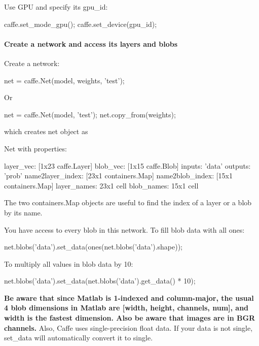 Use G\+PU and specify its gpu\+\_\+id\+: \begin{DoxyVerb}caffe.set_mode_gpu();
caffe.set_device(gpu_id);
\end{DoxyVerb}


\paragraph*{Create a network and access its layers and blobs}

Create a network\+: \begin{DoxyVerb}net = caffe.Net(model, weights, 'test'); %
\end{DoxyVerb}


Or \begin{DoxyVerb}net = caffe.Net(model, 'test'); %
net.copy_from(weights); %
\end{DoxyVerb}


which creates {\ttfamily net} object as \begin{DoxyVerb}  Net with properties:

           layer_vec: [1x23 caffe.Layer]
            blob_vec: [1x15 caffe.Blob]
              inputs: {'data'}
             outputs: {'prob'}
    name2layer_index: [23x1 containers.Map]
     name2blob_index: [15x1 containers.Map]
         layer_names: {23x1 cell}
          blob_names: {15x1 cell}
\end{DoxyVerb}


The two {\ttfamily containers.\+Map} objects are useful to find the index of a layer or a blob by its name.

You have access to every blob in this network. To fill blob \textquotesingle{}data\textquotesingle{} with all ones\+: \begin{DoxyVerb}net.blobs('data').set_data(ones(net.blobs('data').shape));
\end{DoxyVerb}


To multiply all values in blob \textquotesingle{}data\textquotesingle{} by 10\+: \begin{DoxyVerb}net.blobs('data').set_data(net.blobs('data').get_data() * 10);
\end{DoxyVerb}


{\bfseries Be aware that since Matlab is 1-\/indexed and column-\/major, the usual 4 blob dimensions in Matlab are {\ttfamily \mbox{[}width, height, channels, num\mbox{]}}, and {\ttfamily width} is the fastest dimension. Also be aware that images are in B\+GR channels.} Also, Caffe uses single-\/precision float data. If your data is not single, {\ttfamily set\+\_\+data} will automatically convert it to single.

